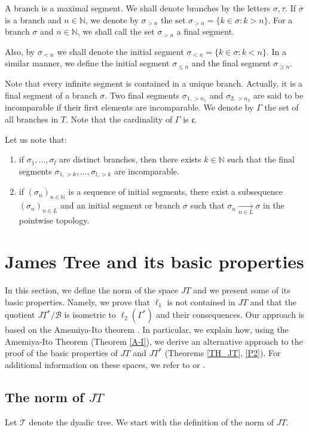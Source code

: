 \documentclass[12pt]{amsart}
\theoremstyle{plain}
\numberwithin{equation}{section}
\newcommand{\N}{\mathbb{N}}
\newcommand{\s}{\sigma}
\newcommand{\Tree}{\mathcal{T}}
\newcommand{\B}{\mathcal{B}}
\begin{document}
A branch is a maximal segment. We shall denote branches by the letters $\sigma,\tau$.
If $\sigma$ is a branch and $n\in\N$, we denote by $\sigma_{> n}$ the set $\sigma_{> n}=\{k\in \sigma: k>n\}$. For a branch $\sigma$ and $n\in\N$, we shall call the set $\sigma_{> n}$ a final segment.

Also, by $\sigma_{< n}$ we shall denote the initial segment $\sigma_{<n}=\{k\in \sigma: k<n\}$. In a similar manner, we define the initial segment $\sigma_{\leq n}$ and the final segment $\sigma_{\geq n}$.

Note that every infinite segment is contained in a unique branch. Actually, it is a final segment of a branch $\sigma$.
Two final segments $\sigma_{1,>n_{1}}$ and $\sigma_{2,>n_{2}}$ are said to be incomparable if their first elements are incomparable.
We denote by $\Gamma$ the set of all branches in $T$. Note that the cardinality of $\Gamma$ is $\mathfrak{c}$.

Let us note that:
\begin{enumerate}
    \item[a)] if $\sigma_{1},\dots,\sigma_{l}$ are distinct branches, then there exists $k\in\N$ such that the final segments $\sigma_{1,> k},\dots, \sigma_{l,>k}$ are incomparable.
    \item[b)] if $(\s_{n})_{n\in\N}$ is a sequence of initial segments, there exist a subsequence $(\s_{n})_{n\in L}$ and an initial segment or branch $\sigma$ such that $\s_{n}\xrightarrow[n\in L]{} \s$ in the pointwise topology.
\end{enumerate}

\section{James Tree and its basic properties}\label{sect:prelim}

In this section, we define the norm of the space $JT$ and we present some of its basic properties. Namely, we prove that $\ell_1$ is not contained in $JT$ and that the quotient $JT^*/ \B$ is isometric to $\ell_2(\Gamma^*)$ and their consequences. Our approach is based on the Amemiya-Ito theorem \cite{AI}. In particular, we explain how, using the Amemiya-Ito Theorem (Theorem \ref{A-I}), we derive an alternative approach to the proof of the basic properties of $JT$ and $JT^*$ (Theorems \ref{TH_JT}, \ref{P2}). For additional information on these spaces, we refer to \cite[Chapter 3]{FetterG} or \cite[Chapter VIII]{Dulst}.

\subsection{The norm of $JT$}
Let $\Tree$ denote the dyadic tree. We start with the definition of the norm of $JT$.
\end{document}
